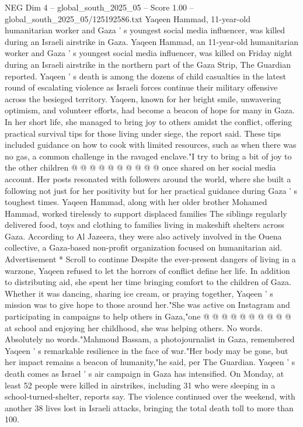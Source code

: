 \begin{textsample}{NEG Dim 4 – global\_south\_2025\_05 – Score 1.00 – global\_south\_2025\_05/125192586.txt}  \label{ex:f4_neg_369}
Yaqeen Hammad, 11-year-old humanitarian worker and Gaza ' s youngest social media influencer, was killed during an Israeli airstrike in Gaza.
Yaqeen Hammad, an 11-year-old humanitarian worker and Gaza ' s youngest social media influencer, was killed on Friday night during an Israeli airstrike in the northern part of the Gaza Strip, The Guardian reported.
Yaqeen ' s death is among the dozens of child casualties in the latest round of escalating violence as Israeli forces continue their military offensive across the besieged territory.
Yaqeen, known for her bright smile, unwavering optimism, and volunteer efforts, had become a beacon of hope for many in Gaza.
In her short life, she managed to bring joy to others amidst the conflict, offering practical survival tips for those living under siege, the report said.
These tips included guidance on how to cook with limited resources, such as when there was no gas, a common challenge in the ravaged enclave."I try to bring a bit of joy to the other children @ @ @ @ @ @ @ @ @ @ once shared on her social media account.
Her posts resonated with followers around the world, where she built a following not just for her positivity but for her practical guidance during Gaza ' s toughest times.
Yaqeen Hammad, along with her older brother Mohamed Hammad, worked tirelessly to support displaced families The siblings regularly delivered food, toys and clothing to families living in makeshift shelters across Gaza.
According to Al Jazeera, they were also actively involved in the Ouena collective, a Gaza-based non-profit organization focused on humanitarian aid.
Advertisement * Scroll to continue Despite the ever-present dangers of living in a warzone, Yaqeen refused to let the horrors of conflict define her life.
In addition to distributing aid, she spent her time bringing comfort to the children of Gaza.
Whether it was dancing, sharing ice cream, or praying together, Yaqeen ' s mission was to give hope to those around her."She was active on Instagram and participating in campaigns to help others in Gaza,"one @ @ @ @ @ @ @ @ @ @ at school and enjoying her childhood, she was helping others.
No words.
Absolutely no words."Mahmoud Bassam, a photojournalist in Gaza, remembered Yaqeen ' s remarkable resilience in the face of war."Her body may be gone, but her impact remains a beacon of humanity,"he said, per The Guardian.
Yaqeen ' s death comes as Israel ' s air campaign in Gaza has intensified.
On Monday, at least 52 people were killed in airstrikes, including 31 who were sleeping in a school-turned-shelter, reports say.
The violence continued over the weekend, with another 38 lives lost in Israeli attacks, bringing the total death toll to more than 100.

\end{textsample}
